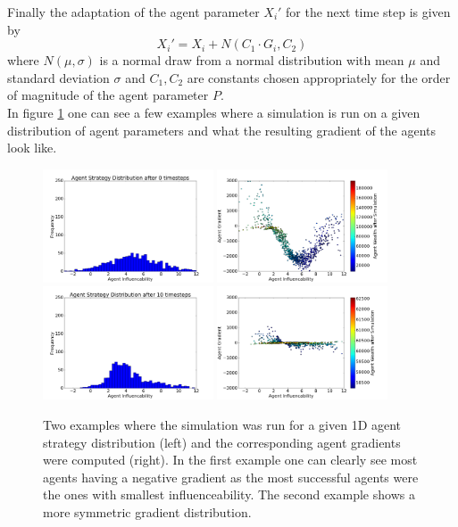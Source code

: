 \documentclass[11pt]{article}
\begin{document}
Finally the adaptation of the agent parameter $X_i'$ for the next time step is given by
\begin{equation}
  X_i' = X_i + N(C_1\cdot G_i, C_2)
\end{equation}
where $N(\mu, \sigma)$ is a normal draw from a normal distribution with mean $\mu$ and standard deviation $\sigma$ and $C_1,C_2$ are constants chosen appropriately for the order of magnitude of the agent parameter $P$. \\
In figure \ref{fig:heuristicgradient} one can see a few examples where a simulation is run on a given distribution of agent parameters and what the resulting gradient of the agents look like.
\begin{figure}
  \centering
  \quad
  \includegraphics[width=0.45\textwidth]{figures/heuristic_gradient_example_1.png}
  \includegraphics[width=0.45\textwidth]{figures/heuristic_gradient_example_2.png}
  \includegraphics[width=0.45\textwidth]{figures/heuristic_gradient_example_3.png}
  \includegraphics[width=0.45\textwidth]{figures/heuristic_gradient_example_4.png}
  \caption[Examples Heuristic Gradient]{Two examples where the simulation was run for a given 1D agent strategy distribution (left) and the corresponding agent gradients were computed (right). In the first example one can clearly see most agents having a negative gradient as the most successful agents were the ones with smallest influenceability. The second example shows a more symmetric gradient distribution.}
  \label{fig:heuristicgradient}
\end{figure}
\end{document}
